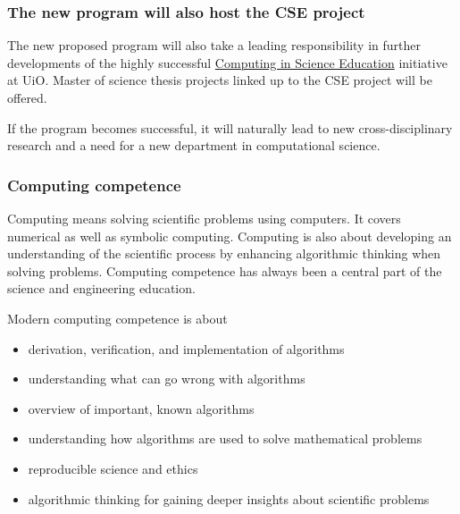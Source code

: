 \documentclass{beamer}
\begin{document}
\begin{frame}
\frametitle{The new program will also host the CSE project}

\begin{block}{}

The new proposed program will also take a leading responsibility in further
developments of the highly successful \href{{http://www.mn.uio.no/english/about/collaboration/cse/}}{Computing in Science Education} initiative at UiO.  Master of science thesis projects linked up to the CSE project will be offered.

If the program becomes successful, it will naturally lead to
new cross-disciplinary research and a need for a new department
in computational science.
\end{block}
\end{frame}

\begin{frame}
\frametitle{Computing competence}

\begin{block}{}
Computing means solving scientific problems using computers. It covers
numerical as well as symbolic computing. Computing is also about
developing an understanding of the scientific process by enhancing
algorithmic thinking when solving problems.  Computing competence has
always been a central part of the science and engineering
education.

Modern computing competence is about

\begin{itemize}
\item derivation, verification, and implementation of algorithms

\item understanding what can go wrong with algorithms

\item overview of important, known algorithms

\item understanding how algorithms are used to solve mathematical problems

\item reproducible science and ethics

\item algorithmic thinking for gaining deeper insights about scientific problems
\end{itemize}

\noindent
\end{block}
\end{frame}
\end{document}
